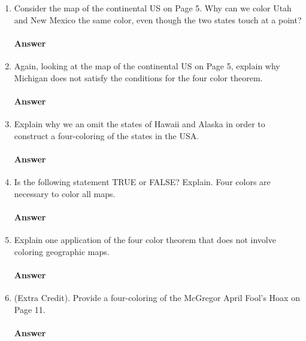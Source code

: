\documentclass{article}
\begin{document}
\begin{enumerate}

    \item Consider the map of the continental US on Page 5.  Why can we color
        Utah and New Mexico the same color, even though the two states touch at
        a point?

        \paragraph{Answer}

    \item Again, looking at the map of the continental US on Page 5, explain why
        Michigan does not satisfy the conditions for the four color theorem.

        \paragraph{Answer}

    \item Explain why we an omit the states of Hawaii and Alaska in order to
        construct a four-coloring of the states in the USA.

        \paragraph{Answer}

    \item Is the following statement TRUE or FALSE?  Explain. Four colors are
        necessary to color all maps.

        \paragraph{Answer}

    \item Explain one application of the four color theorem that does not
        involve coloring geographic maps.

        \paragraph{Answer}

    \item (Extra Credit). Provide a four-coloring of the McGregor April Fool's
        Hoax on Page 11.

        \paragraph{Answer}

\end{enumerate}
\end{document}
